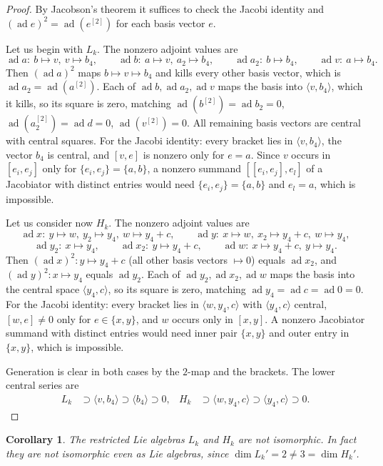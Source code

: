 \documentclass[11pt,reqno]{amsart}
\theoremstyle{plain}
\newtheorem{corollary}[theorem]{Corollary}
\theoremstyle{remark}
\newcommand{\ad}{\operatorname{ad}}
\newcommand{\spann}[1]{\langle #1\rangle}
\begin{document}
\begin{proof}
By Jacobson's theorem it suffices to check the Jacobi identity and
$(\ad e)^2=\ad(e^{[2]})$ for each basis vector $e$.

Let us begin with $L_k$. The nonzero adjoint values are
\[
\ad a\colon \ b\mapsto v,\ v\mapsto b_4,\qquad
\ad b\colon \ a\mapsto v,\ a_2\mapsto b_4,\qquad
\ad a_2\colon \ b\mapsto b_4,\qquad
\ad v\colon \ a\mapsto b_4 .
\]
Then $(\ad a)^2$ maps $b\mapsto v\mapsto b_4$ and kills every other basis
vector, which is $\ad a_2=\ad(a^{[2]})$. Each of $\ad b,\ad a_2,\ad v$ maps
the basis into $\spann{v,b_4}$, which it kills, so its square is zero,
matching $\ad(b^{[2]})=\ad b_2=0$, $\ad(a_2^{[2]})=\ad d=0$,
$\ad(v^{[2]})=0$. All remaining basis vectors are central with central
squares. For the Jacobi identity: every bracket lies in $\spann{v,b_4}$, the
vector $b_4$ is central, and $[v,e]$ is nonzero only for $e=a$. Since $v$
occurs in $[e_i,e_j]$ only for $\{e_i,e_j\}=\{a,b\}$, a nonzero summand
$[[e_i,e_j],e_l]$ of a Jacobiator with distinct entries would need
$\{e_i,e_j\}=\{a,b\}$ and $e_l=a$, which is impossible.

Let us consider now $H_k$. The nonzero adjoint values are
\[
\ad x\colon \ y\mapsto w,\ y_2\mapsto y_4,\ w\mapsto y_4+c,\qquad
\ad y\colon \ x\mapsto w,\ x_2\mapsto y_4+c,\ w\mapsto y_4,
\]
\[
\ad y_2\colon \ x\mapsto y_4,\qquad
\ad x_2\colon \ y\mapsto y_4+c,\qquad
\ad w\colon \ x\mapsto y_4+c,\ y\mapsto y_4 .
\]
Then $(\ad x)^2\colon y\mapsto y_4+c$ (all other basis vectors $\mapsto0$)
equals $\ad x_2$, and $(\ad y)^2\colon x\mapsto y_4$ equals $\ad y_2$. Each of
$\ad y_2,\ad x_2,\ad w$ maps the basis into the central space
$\spann{y_4,c}$, so its square is zero, matching $\ad y_4=\ad c=\ad 0=0$. For
the Jacobi identity: every bracket lies in $\spann{w,y_4,c}$ with
$\spann{y_4,c}$ central, $[w,e]\neq0$ only for $e\in\{x,y\}$, and $w$ occurs
only in $[x,y]$. A nonzero Jacobiator summand with distinct entries would need
inner pair $\{x,y\}$ and outer entry in $\{x,y\}$, which is impossible.

Generation is clear in both cases by the $2$-map and the brackets. The lower
central series are
\begin{align*}
	L_k&\supset\spann{v,b_4}\supset\spann{b_4}\supset0,  & H_k&\supset\spann{w,y_4,c}\supset\spann{y_4,c}\supset0. 
\end{align*}
\end{proof}

\begin{corollary}\label{cor:noniso2}
The restricted Lie algebras $L_k$ and $H_k$ are not isomorphic. In fact they
are not isomorphic even as Lie algebras, since
$\dim L_k'=2\neq3=\dim H_k'$.
\end{corollary}
\end{document}
